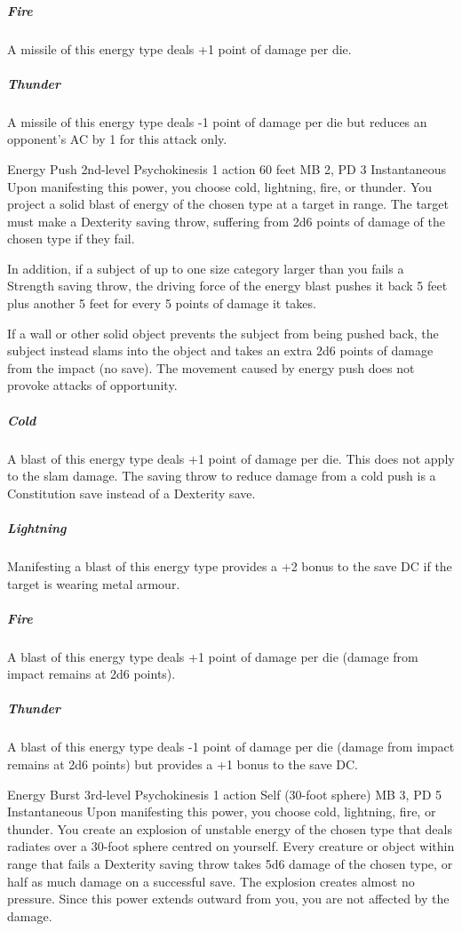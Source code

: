   \subparagraph{Fire}
  A missile of this energy type deals +1 point of damage per die.
  
  \subparagraph{Thunder}
  A missile of this energy type deals -1 point of damage per die
  but reduces an opponent's AC by 1 for this attack only.

\DndPowerHeader%
  {Energy Push}
  {2nd-level Psychokinesis}
  {1 action}
  {60 feet}
  {MB 2, PD 3}
  {Instantaneous}
  Upon manifesting this power, you choose cold, lightning, fire, or thunder.
  You project a solid blast of energy of the chosen type at a target in range.
  The target must make a Dexterity saving throw,
  suffering from 2d6 points of damage of the chosen type if they fail.
  
  In addition, if a subject of up to one size category larger than you
  fails a Strength saving throw,
  the driving force of the energy blast pushes it back 5 feet
  plus another 5 feet for every 5 points of damage it takes.
  
  If a wall or other solid object prevents the subject from being pushed back,
  the subject instead slams into the object and takes an extra
  2d6 points of damage from the impact (no save).
  The movement caused by energy push does not provoke attacks of opportunity.
  \subparagraph{Cold}
    A blast of this energy type deals +1 point of damage per die.
    This does not apply to the slam damage.
    The saving throw to reduce damage from a cold push
    is a Constitution save instead of a Dexterity save.
  \subparagraph{Lightning}
    Manifesting a blast of this energy type provides a +2 bonus
    to the save DC if the target is wearing metal armour.
  \subparagraph{Fire}
    A blast of this energy type deals +1 point of damage per die
    (damage from impact remains at 2d6 points).
  \subparagraph{Thunder}
    A blast of this energy type deals -1 point of damage per die
    (damage from impact remains at 2d6 points)
    but provides a +1 bonus to the save DC.

\DndPowerHeader%
  {Energy Burst}
  {3rd-level Psychokinesis}
  {1 action}
  {Self (30-foot sphere)}
  {MB 3, PD 5}
  {Instantaneous}
Upon manifesting this power, you choose cold, lightning,
fire, or thunder.
You create an explosion of unstable energy of the chosen type
that deals radiates over a 30-foot sphere
centred on yourself.
Every creature or object within range that fails a Dexterity saving throw
takes 5d6 damage of the chosen type, or
half as much damage on a successful save.
The explosion creates almost no pressure.
Since this power extends outward from you,
you are not affected by the damage.

